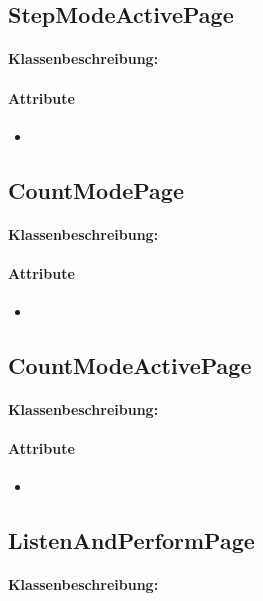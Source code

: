\documentclass[a4paper,12pt]{article}
\begin{document}
	\subsection{StepModeActivePage}
	\paragraph{Klassenbeschreibung:}
	\paragraph{Attribute}
		\begin{itemize}
			\item
		\end{itemize}
	
	\subsection{CountModePage}
	\paragraph{Klassenbeschreibung:}
	\paragraph{Attribute}
		\begin{itemize}
			\item
		\end{itemize}

	\subsection{CountModeActivePage}
	\paragraph{Klassenbeschreibung:}
	\paragraph{Attribute}
		\begin{itemize}
			\item
		\end{itemize}

	\subsection{ListenAndPerformPage}
	\paragraph{Klassenbeschreibung:}
\end{document}
